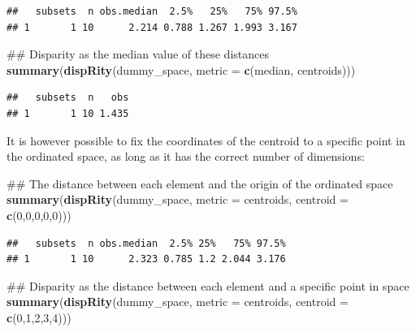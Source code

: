 \documentclass[]{book}
\newenvironment{Shaded}{\begin{snugshade}}{\end{snugshade}}
\newcommand{\KeywordTok}[1]{\textcolor[rgb]{0.13,0.29,0.53}{\textbf{#1}}}
\newcommand{\DataTypeTok}[1]{\textcolor[rgb]{0.13,0.29,0.53}{#1}}
\newcommand{\DecValTok}[1]{\textcolor[rgb]{0.00,0.00,0.81}{#1}}
\newcommand{\NormalTok}[1]{#1}
\theoremstyle{definition}
\theoremstyle{definition}
\theoremstyle{remark}
\begin{document}
\begin{verbatim}
##   subsets  n obs.median  2.5%   25%   75% 97.5%
## 1       1 10      2.214 0.788 1.267 1.993 3.167
\end{verbatim}

\begin{Shaded}
\begin{Highlighting}[]
\NormalTok{## Disparity as the median value of these distances}
\KeywordTok{summary}\NormalTok{(}\KeywordTok{dispRity}\NormalTok{(dummy_space, }\DataTypeTok{metric =} \KeywordTok{c}\NormalTok{(median, centroids)))}
\end{Highlighting}
\end{Shaded}

\begin{verbatim}
##   subsets  n   obs
## 1       1 10 1.435
\end{verbatim}

It is however possible to fix the coordinates of the centroid to a
specific point in the ordinated space, as long as it has the correct
number of dimensions:

\begin{Shaded}
\begin{Highlighting}[]
\NormalTok{## The distance between each element and the origin of the ordinated space}
\KeywordTok{summary}\NormalTok{(}\KeywordTok{dispRity}\NormalTok{(dummy_space, }\DataTypeTok{metric =}\NormalTok{ centroids, }\DataTypeTok{centroid =} \KeywordTok{c}\NormalTok{(}\DecValTok{0}\NormalTok{,}\DecValTok{0}\NormalTok{,}\DecValTok{0}\NormalTok{,}\DecValTok{0}\NormalTok{,}\DecValTok{0}\NormalTok{)))}
\end{Highlighting}
\end{Shaded}

\begin{verbatim}
##   subsets  n obs.median  2.5% 25%   75% 97.5%
## 1       1 10      2.323 0.785 1.2 2.044 3.176
\end{verbatim}

\begin{Shaded}
\begin{Highlighting}[]
\NormalTok{## Disparity as the distance between each element and a specific point in space}
\KeywordTok{summary}\NormalTok{(}\KeywordTok{dispRity}\NormalTok{(dummy_space, }\DataTypeTok{metric =}\NormalTok{ centroids, }\DataTypeTok{centroid =} \KeywordTok{c}\NormalTok{(}\DecValTok{0}\NormalTok{,}\DecValTok{1}\NormalTok{,}\DecValTok{2}\NormalTok{,}\DecValTok{3}\NormalTok{,}\DecValTok{4}\NormalTok{)))}
\end{Highlighting}
\end{Shaded}
\end{document}
